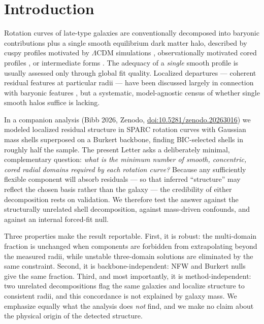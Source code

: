 \documentclass[twocolumn]{aastex631}
\providecommand{\doi}[1]{\href{https://doi.org/#1}{doi:#1}}
\begin{document}
\section{Introduction} \label{sec:intro}

Rotation curves of late-type galaxies are conventionally decomposed into
baryonic contributions plus a single smooth equilibrium dark matter halo,
described by cuspy profiles motivated by $\Lambda$CDM simulations
\citep[NFW;][]{Navarro1996}, observationally motivated cored profiles
\citep[Burkert;][]{Burkert1995}, or intermediate forms
\citep[Einasto;][]{Einasto1965}. The adequacy of a \emph{single} smooth
profile is usually assessed only through global fit quality. Localized
departures --- coherent residual features at particular radii --- have been
discussed largely in connection with baryonic features
\citep[``Renzo's rule'';][]{Sancisi2004}, but a systematic, model-agnostic
census of whether single smooth halos suffice is lacking.

In a companion analysis (Bibb 2026, Zenodo, \doi{10.5281/zenodo.20263016}) we modeled localized
residual structure in SPARC \citep{Lelli2016} rotation curves with Gaussian
mass shells superposed on a Burkert backbone, finding BIC-selected shells in
roughly half the sample. The present Letter asks a deliberately minimal,
complementary question: \emph{what is the minimum number of smooth,
concentric, cored radial domains required by each rotation curve?} Because
any sufficiently flexible component will absorb residuals --- so that
inferred ``structure'' may reflect the chosen basis rather than the galaxy
--- the credibility of either decomposition rests on validation. We therefore
test the answer against the structurally unrelated shell decomposition,
against mass-driven confounds, and against an internal forced-fit null.

Three properties make the result reportable. First, it is robust: the
multi-domain fraction is unchanged when components are forbidden from
extrapolating beyond the measured radii, while unstable three-domain
solutions are eliminated by the same constraint. Second, it is
backbone-independent: NFW and Burkert nulls give the same fraction. Third,
and most importantly, it is method-independent: two unrelated decompositions
flag the same galaxies and localize structure to consistent radii, and this
concordance is not explained by galaxy mass. We emphasize equally what the
analysis does \emph{not} find, and we make no claim about the physical origin
of the detected structure.
\end{document}
